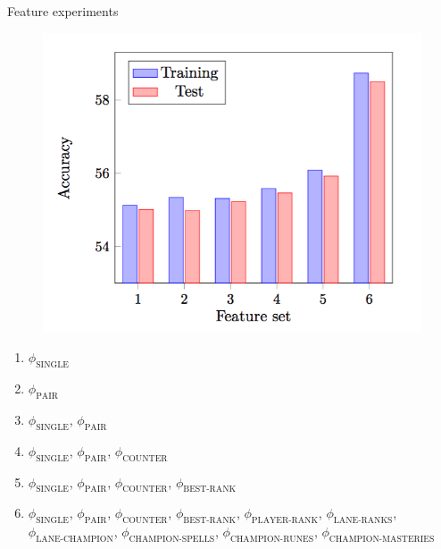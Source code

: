 \begin{frame}{Feature experiments}
\begin{minipage}{0.55\linewidth} 
  \begin{figure}[H]
    \includegraphics[width=\linewidth]{experiments/featuretest.png}
  \end{figure}
\end{minipage}    
\begin{minipage}{0.40\linewidth}
\footnotesize{
\begin{enumerate}
\item $\phi_\text{SINGLE}$
\item $\phi_\text{PAIR}$
\item $\phi_\text{SINGLE}$, $\phi_\text{PAIR}$
\item $\phi_\text{SINGLE}$, $\phi_\text{PAIR}$, $\phi_\text{COUNTER}$
\item $\phi_\text{SINGLE}$, $\phi_\text{PAIR}$, $\phi_\text{COUNTER}$, $\phi_\text{BEST-RANK}$
\item $\phi_\text{SINGLE}$, $\phi_\text{PAIR}$, $\phi_\text{COUNTER}$, $\phi_\text{BEST-RANK}$, $\phi_\text{PLAYER-RANK}$, $\phi_\text{LANE-RANKS}$, $\phi_\text{LANE-CHAMPION}$, $\phi_\text{CHAMPION-SPELLS}$, $\phi_\text{CHAMPION-RUNES}$, $\phi_\text{CHAMPION-MASTERIES}$
\end{enumerate}
}
\end{minipage}
\end{frame}


